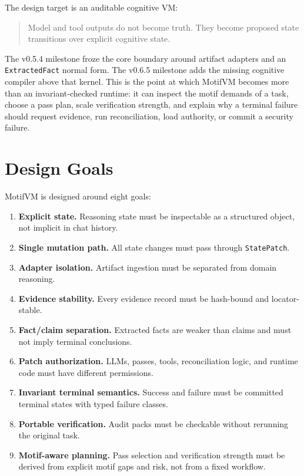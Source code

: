 \documentclass[11pt]{article}
\begin{document}
The design target is an auditable cognitive VM:

\begin{quote}
Model and tool outputs do not become truth. They become proposed state transitions over explicit cognitive state.
\end{quote}

The v0.5.4 milestone froze the core boundary around artifact adapters and an \texttt{ExtractedFact} normal form. The v0.6.5 milestone adds the missing cognitive compiler above that kernel. This is the point at which MotifVM becomes more than an invariant-checked runtime: it can inspect the motif demands of a task, choose a pass plan, scale verification strength, and explain why a terminal failure should request evidence, run reconciliation, load authority, or commit a security failure.

\section{Design Goals}

MotifVM is designed around eight goals:

\begin{enumerate}[leftmargin=1.5em]
  \item \textbf{Explicit state.} Reasoning state must be inspectable as a structured object, not implicit in chat history.
  \item \textbf{Single mutation path.} All state changes must pass through \texttt{StatePatch}.
  \item \textbf{Adapter isolation.} Artifact ingestion must be separated from domain reasoning.
  \item \textbf{Evidence stability.} Every evidence record must be hash-bound and locator-stable.
  \item \textbf{Fact/claim separation.} Extracted facts are weaker than claims and must not imply terminal conclusions.
  \item \textbf{Patch authorization.} LLMs, passes, tools, reconciliation logic, and runtime code must have different permissions.
  \item \textbf{Invariant terminal semantics.} Success and failure must be committed terminal states with typed failure classes.
  \item \textbf{Portable verification.} Audit packs must be checkable without rerunning the original task.
  \item \textbf{Motif-aware planning.} Pass selection and verification strength must be derived from explicit motif gaps and risk, not from a fixed workflow.
\end{enumerate}
\end{document}

